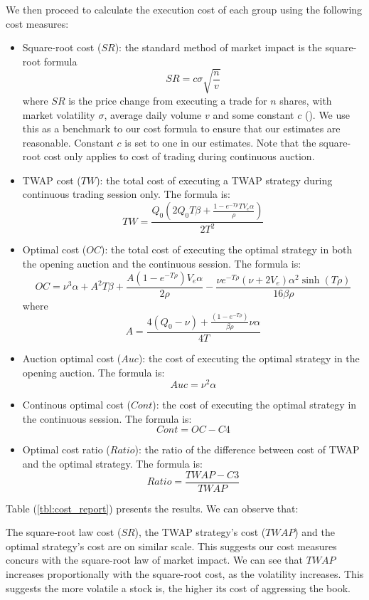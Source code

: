 We then proceed to calculate the execution cost of each group using the following cost measures:
\begin{itemize}
  \item Square-root cost ($SR$): the standard method of market impact is the square-root formula
        \[
          SR = c \sigma \sqrt{\frac{n}{v}}
        \]
        where $SR$ is the price change from executing a trade for $n$ shares, with market volatility $\sigma$, average daily volume $v$ and some constant $c$ (\cite{Toth2011}). We use this as a benchmark to our cost formula to ensure that our estimates are reasonable. Constant $c$ is set to one in our estimates. Note that the square-root cost only applies to cost of trading during continuous auction.
  \item TWAP cost ($TW$): the total cost of executing a TWAP strategy during continuous trading session only. The formula is:
        \[
          TW = \frac{Q_0 (2 Q_0 T \beta + \frac{1-e^{-T \rho} T V_e \alpha}{\rho})}{2 T^2}
        \]
  \item Optimal cost ($OC$): the total cost of executing the optimal strategy in both the opening auction and the continuous session. The formula is:
        \[
          OC = \nu^3 \alpha + A^2 T \beta + \frac{A (1-e^{-T \rho}) V_e \alpha}{2 \rho} - \frac{\nu e^{-T \rho} (\nu + 2 V_e) \alpha^2 \sinh(T \rho)}{16 \beta \rho}
        \]
        where
        \[
          A =   \frac{4 (Q_0 - \nu) + \frac{(1 - e^{-T \rho})}{\beta \rho} \nu \alpha} {4 T}
        \]
  \item Auction optimal cost ($Auc$): the cost of executing the optimal strategy in the opening auction. The formula is:
        \[
          Auc = \nu^2 \alpha
        \]
  \item Continous optimal cost ($Cont$): the cost of executing the optimal strategy in the continuous session. The formula is:
        \[
          Cont = OC - C4
        \]
  \item Optimal cost ratio ($Ratio$): the ratio of the difference between cost of TWAP and the optimal strategy. The formula is:
        \[
          Ratio = \frac{TWAP - C3}{TWAP}
        \]
\end{itemize}

Table (\ref{tbl:cost_report}) presents the results. We can observe that:

The square-root law cost ($SR$), the TWAP strategy's cost ($TWAP$) and the optimal strategy's cost are on similar scale. This suggests our cost measures concurs with the square-root law of market impact. We can see that $TWAP$ increases proportionally with the square-root cost, as the volatility increases. This suggests the more volatile a stock is, the higher its cost of aggressing the book.

